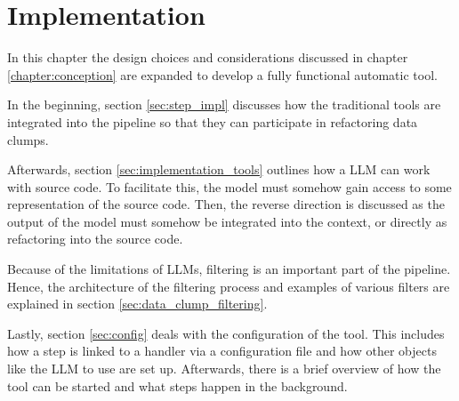 \chapter{Implementation}\label{chapter:implementation}


In this chapter the design choices and considerations discussed in chapter \ref{chapter:conception} are expanded to develop a fully functional automatic tool. 

In the beginning, section  \ref{sec:step_impl} discusses how the traditional tools are integrated into the pipeline so that they can participate in refactoring data clumps. 

Afterwards, section \ref{sec:implementation_tools} outlines how a \ac{LLM} can work with source code. To facilitate this, the model must somehow gain access to some representation of the source code. Then, the reverse direction is discussed as the output of the model must somehow be integrated into the context, or directly as refactoring into the source code. 

Because of the limitations of \acp{LLM}, filtering is an important part of the pipeline. Hence, the architecture of the filtering process and examples of various filters are explained in section \ref{sec:data_clump_filtering}.

Lastly, section \ref{sec:config} deals with the configuration of the tool. This includes how a step is linked to a handler via a configuration file and  how other objects like the \ac{LLM} to use are set up. Afterwards, there is  a brief overview of how the tool can be started and what steps happen in the background.






